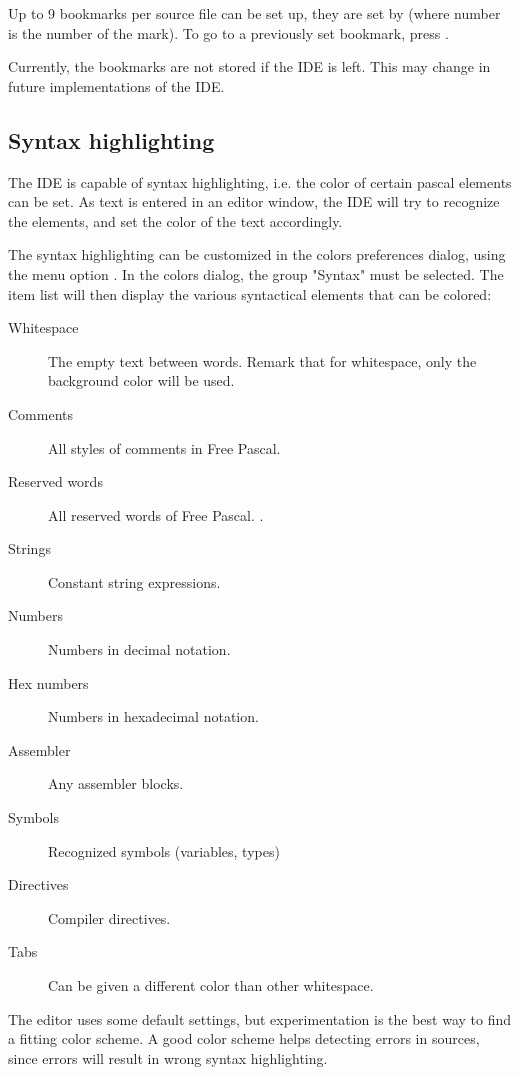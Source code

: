 Up to 9 bookmarks per source file can be set up, they are set by
 (where number is the number of the mark).
To go to a previously set bookmark, press .

\begin{remark}
Currently, the bookmarks are not stored if the IDE is left. This may
change in future implementations of the IDE.
\end{remark}

%
%
\subsection{Syntax highlighting}
\label{se:syntaxhighlighting}
The IDE is capable of syntax highlighting, i.e. the color of certain 
pascal elements can be set. As text is entered in an editor window, 
the IDE will try to recognize the elements, and set the color of the
text accordingly.


The syntax highlighting can be customized in the colors preferences dialog,
using the menu option . In the colors dialog, the
group "Syntax" must be selected. The item list will then display the 
various syntactical elements that can be colored:
\begin{description}
\item[Whitespace] The empty text between words. Remark that for whitespace,
only the background color will be used.
\item[Comments] All styles of comments in Free Pascal.
\item[Reserved words] All reserved words of Free Pascal. .
\item[Strings] Constant string expressions.
\item[Numbers] Numbers in decimal notation.
\item[Hex numbers] Numbers in hexadecimal notation.
\item[Assembler] Any assembler blocks.
\item[Symbols] Recognized symbols (variables, types)
\item[Directives] Compiler directives.
\item[Tabs] Can be given a different color than other whitespace.
\end{description}
The editor uses some default settings, but experimentation is the best way
to find a fitting color scheme. A good color scheme helps detecting errors
in sources, since errors will result in wrong syntax highlighting. 


